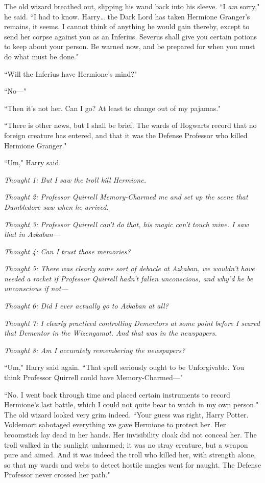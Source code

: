 The old wizard breathed out, slipping his wand back into his sleeve. ``I \emph{am} sorry," he said. ``I had to know. Harry{\ldots} the Dark Lord has taken Hermione Granger's remains, it seems. I cannot think of anything he would gain thereby, except to send her corpse against you as an Inferius. Severus shall give you certain potions to keep about your person. Be warned now, and be prepared for when you must do what must be done."

``Will the Inferius have Hermione's mind?"

``No---"

``Then it's not her. Can I go? At least to change out of my pajamas."

``There is other news, but I shall be brief. The wards of Hogwarts record that no foreign creature has entered, and that it was the Defense Professor who killed Hermione Granger."

``Um," Harry said.

\emph{Thought 1: But I saw the troll kill Hermione.}

\emph{Thought 2: Professor Quirrell Memory-Charmed me and set up the scene that Dumbledore saw when he arrived.}

\emph{Thought 3: Professor Quirrell can't do that, his magic can't touch mine. I saw that in Azkaban---}

\emph{Thought 4: Can I trust those memories?}

\emph{Thought 5: There was clearly some sort of debacle at Azkaban, we wouldn't have needed a rocket if Professor Quirrell hadn't fallen unconscious, and why'd he be unconscious if not---}

\emph{Thought 6: Did I ever actually go to Azkaban at all?}

\emph{Thought 7: I clearly practiced controlling Dementors at some point before I scared that Dementor in the Wizengamot. And \emph{that} was in the newspapers.}

\emph{Thought 8: Am I accurately remembering the newspapers?}

``Um," Harry said again. ``That spell seriously ought to be Unforgivable. You think Professor Quirrell could have Memory-Charmed---"

``No. I went back through time and placed certain instruments to record Hermione's last battle, which I could not quite bear to watch in my own person." The old wizard looked very grim indeed. ``Your guess was right, Harry Potter. Voldemort sabotaged everything we gave Hermione to protect her. Her broomstick lay dead in her hands. Her invisibility cloak did not conceal her. The troll walked in the sunlight unharmed; it was no stray creature, but a weapon pure and aimed. And it was indeed the troll who killed her, with strength alone, so that my wards and webs to detect hostile magics went for naught. The Defense Professor never crossed her path."

